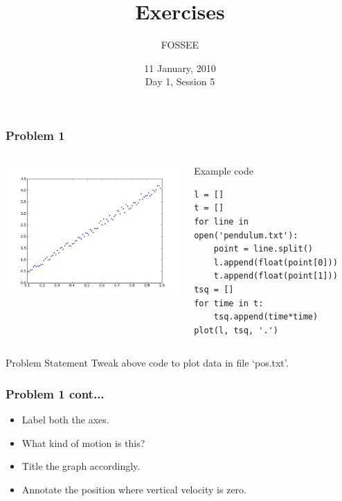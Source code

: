 \documentclass[14pt,compress]{beamer}
\title[Exercises]{Exercises}
\author[FOSSEE] {FOSSEE}
\institute[IIT Bombay] {Department of Aerospace Engineering\\IIT Bombay}
\date[] {11 January, 2010\\Day 1, Session 5}
\newcounter{time}
\begin{document}
\begin{frame}
  \titlepage
\end{frame}


\begin{frame}[fragile]
  \frametitle{Problem 1}
  \begin{columns}
    \hspace*{-0.5in}
    \includegraphics[height=2in, interpolate=true]{data/L-Tsq.png}
    \begin{block}{Example code}
    \tiny
    \begin{lstlisting}
l = []
t = []
for line in open('pendulum.txt'):
    point = line.split()
    l.append(float(point[0]))
    t.append(float(point[1]))
tsq = []
for time in t:
    tsq.append(time*time)
plot(l, tsq, '.')
    \end{lstlisting}
    \end{block}
  \end{columns}
  \begin{block}{Problem Statement}
    Tweak above code to plot data in file `pos.txt'.
  \end{block}
\end{frame}

\begin{frame}
  \frametitle{Problem 1 cont...}
  \begin{itemize}
  \item Label both the axes.
  \item What kind of motion is this?
  \item Title the graph accordingly.
  \item Annotate the position where vertical velocity is zero.
  \end{itemize}
\end{frame}
\end{document}
